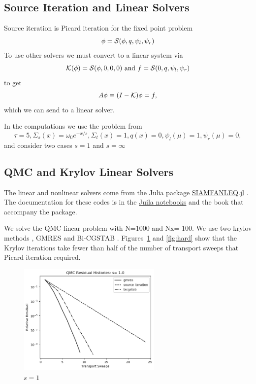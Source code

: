 \subsection{Source Iteration and Linear Solvers}
\label{subsec:source}

Source iteration is Picard iteration for the fixed point problem
\[
\phi = {\cal S}(\phi, q, \psi_l, \psi_r)
\]
To use other solvers we must convert to a linear system via
\[
{\cal K}(\phi) = {\cal S}(\phi, 0, 0, 0) \mbox{ and }
f = {\cal S}(0, q, \psi_l, \psi_r)
\]
to get
\[
A \phi \equiv (I - {\cal K}) \phi = f,
\]
which we can send to a linear solver.

In the computations we use the problem from \cite{cesinh}
\[
\tau=5, \Sigma_s(x) =\omega_0 e^{-x/s},  \Sigma_t(x) = 1, q(x) = 0, \psi_l(\mu) = 1, \psi_r(\mu) = 0,
\]
and consider two cases $s=1$ and $s=\infty$ 

\clearpage

\subsection{QMC and Krylov Linear Solvers}
\label{subsec:krylov}


The linear and nonlinear solvers come from the Julia package
\href{https://github.com/ctkelley/SIAMFANLEquations.jl}{SIAMFANLEQ.jl}
\cite{ctk:siamfanl}. The documentation for these codes is in the
\href{https://github.com/ctkelley/NotebookSIAMFANL}{Juila notebooks}
\cite{ctk:notebooknl} and the book \cite{ctk:fajulia}
that accompany the package. 


We solve the QMC linear problem with N=1000 and Nx= 100. 
We use two krylov methods \cite{ctk:roots}, GMRES \cite{gmres} and
Bi-CGSTAB \cite{bicgstab}.  Figures~\ref{fig:easy} and 
\ref{fig:hard} show that
the Krylov iterations take fewer than half of the number
of transport sweeps that Picard iteration required.

\vspace*{.25in}

\begin{figure}[h]
  \centering
  \includegraphics[trim = 10mm 0mm 15mm 15mm, width=70mm]{FIGURES/seqone.png}
  \caption{$s = 1$}
  \label{fig:easy}
\end{figure}



